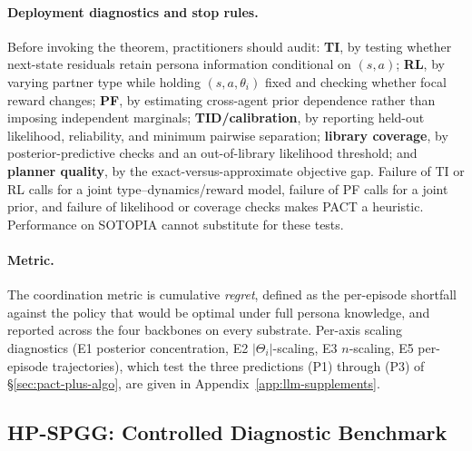 \documentclass{article}
\begin{document}
\paragraph{Deployment diagnostics and stop rules.} Before invoking the theorem, practitioners should audit: \textbf{TI}, by testing whether next-state residuals retain persona information conditional on $(s,a)$; \textbf{RL}, by varying partner type while holding $(s,a,\theta_i)$ fixed and checking whether focal reward changes; \textbf{PF}, by estimating cross-agent prior dependence rather than imposing independent marginals; \textbf{TID/calibration}, by reporting held-out likelihood, reliability, and minimum pairwise separation; \textbf{library coverage}, by posterior-predictive checks and an out-of-library likelihood threshold; and \textbf{planner quality}, by the exact-versus-approximate objective gap. Failure of TI or RL calls for a joint type--dynamics/reward model, failure of PF calls for a joint prior, and failure of likelihood or coverage checks makes PACT a heuristic. Performance on SOTOPIA cannot substitute for these tests.

\paragraph{Metric.} The coordination metric is cumulative \emph{regret}, defined as the per-episode shortfall against the policy that would be optimal under full persona knowledge, and reported across the four backbones on every substrate. Per-axis scaling diagnostics (E1 posterior concentration, E2 $|\Theta_i|$-scaling, E3 $n$-scaling, E5 per-episode trajectories), which test the three predictions (P1) through (P3) of \S\ref{sec:pact-plus-algo}, are given in Appendix~\ref{app:llm-supplements}.

\subsection{HP-SPGG: Controlled Diagnostic Benchmark}
\label{sec:hp-spgg}
\end{document}
